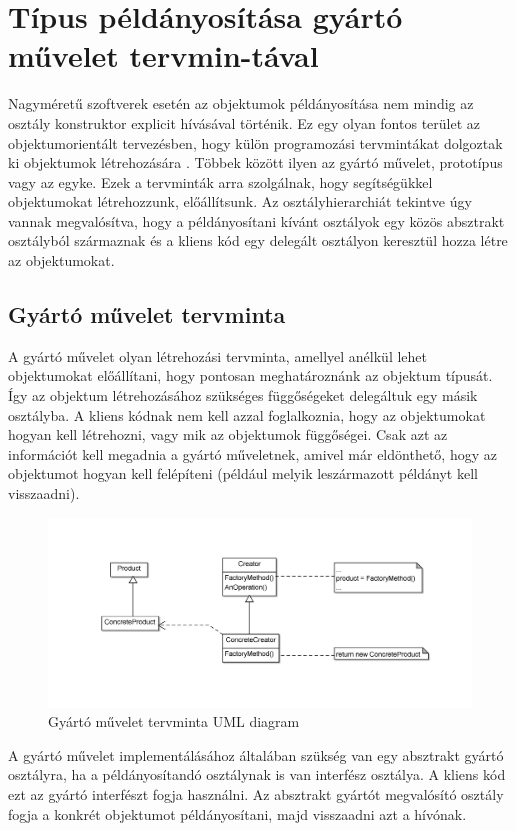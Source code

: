 \documentclass[a4paper,12pt]{report}
\begin{document}
\section{Típus példányosítása gyártó művelet tervmin-tával}
Nagyméretű szoftverek esetén az objektumok példányosítása nem mindig az osztály konstruktor explicit hívásával történik. Ez egy olyan fontos terület az objektumorientált tervezésben, hogy külön programozási tervmintákat dolgoztak ki objektumok létrehozására \cite{design_patterns}. Többek között ilyen az gyártó művelet, prototípus vagy az egyke. Ezek a tervminták arra szolgálnak, hogy segítségükkel objektumokat létrehozzunk, előállítsunk. Az osztályhierarchiát tekintve úgy vannak megvalósítva, hogy a példányosítani kívánt osztályok egy közös absztrakt osztályból származnak és a kliens kód egy delegált osztályon keresztül hozza létre az objektumokat.
\subsection{Gyártó művelet tervminta}
A gyártó művelet olyan létrehozási tervminta, amellyel anélkül lehet objektumokat előállítani, hogy pontosan meghatároznánk az objektum típusát. Így az objektum létrehozásához szükséges függőségeket delegáltuk egy másik osztályba. A kliens kódnak nem kell azzal foglalkoznia, hogy az objektumokat hogyan kell létrehozni, vagy mik az objektumok függőségei. Csak azt az információt kell megadnia a gyártó műveletnek, amivel már eldönthető, hogy az objektumot hogyan kell felépíteni (például melyik leszármazott példányt kell visszaadni).

\begin{figure}
	\caption{Gyártó művelet tervminta  UML diagram}
	\centering
	\includegraphics[width=15cm,keepaspectratio]{factory_method.png}
\end{figure}

A gyártó művelet implementálásához általában szükség van egy absztrakt gyártó osztályra, ha a példányosítandó osztálynak is van interfész osztálya. A kliens kód ezt az gyártó interfészt fogja használni. Az absztrakt gyártót megvalósító osztály  fogja a konkrét objektumot példányosítani, majd visszaadni azt a hívónak.
\end{document}
